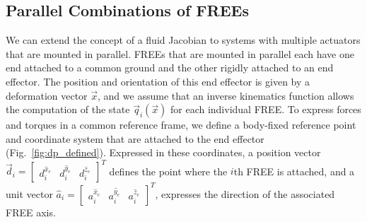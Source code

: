 \subsection{Parallel Combinations of FREEs}
\label{sec:parallelActuators}
We can extend the concept of a fluid Jacobian to systems with multiple actuators that are mounted in parallel.
FREEs that are mounted in parallel each have one end attached to a common ground and the other rigidly attached to an end effector.
The position and orientation of this end effector is given by a deformation vector $\vec{x}$, and we assume that an inverse kinematics function allows the computation of the state $\vec{q}_i \left(\vec{x}\right)$ for each individual FREE.
To express forces and torques in a common reference frame, we define a body-fixed reference point and coordinate system that are attached to the end effector (Fig.~\ref{fig:dp_defined}). 
Expressed in these coordinates, a position vector ${\vec{d}_i = \begin{bmatrix} d_i^{\hat{x}_e} & d_i^{\hat{y}_e} & d_i^{\hat{z}_e} \end{bmatrix}^T}$ defines the point where the $i$th FREE is attached, and a unit vector ${\hat{a}_i = \begin{bmatrix} a_i^{\hat{x}_e} & a_i^{\hat{y}_e} & a_i^{\hat{z}_e} \end{bmatrix}^T}$, expresses the direction of the associated FREE axis.

